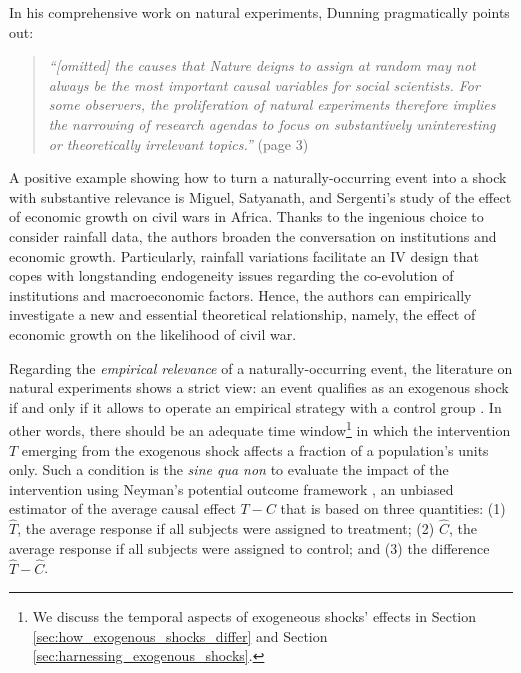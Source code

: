 \documentclass[11pt]{article}
\begin{document}
\begin{refsection}
In his comprehensive work on natural experiments, Dunning 
\autocite*{dunning_2012} pragmatically points out:

\begin{quote}
  \textit{
  ``[omitted] the causes that Nature deigns to assign at random may not always be
  the most important causal variables for social scientists. For some observers,
  the proliferation of natural experiments therefore implies the narrowing of
  research agendas to focus on substantively uninteresting or theoretically
  irrelevant topics.''
  }
  (page 3)
\end{quote}

A positive example showing how to turn a naturally-occurring event into a shock
with substantive relevance is Miguel, Satyanath, and Sergenti's
\autocite*{miguel_et_al_2004} study of the effect of economic growth on civil
wars in Africa. Thanks to the ingenious choice to consider rainfall data,
the authors broaden the conversation on institutions and economic growth.
Particularly, rainfall variations facilitate an IV design that copes with
longstanding endogeneity issues regarding the co-evolution of institutions and
macroeconomic factors. Hence, the authors can empirically investigate a new
and essential theoretical relationship, namely, the effect of economic growth on
the likelihood of civil war. 

Regarding the \textit{empirical relevance} of a naturally-occurring event, the
literature on natural experiments shows a strict view: an event qualifies as an
exogenous shock if and only if it allows to operate an empirical strategy with
a control group \autocite[][]{cook_et_al_2002}. In other words, there should be
an adequate time window\footnote{We discuss the temporal aspects of exogeneous
shocks' effects in Section \ref{sec:how_exogenous_shocks_differ} and Section
\ref{sec:harnessing_exogenous_shocks}.} in which the intervention $T$ emerging
from the exogenous shock affects a fraction of a population's units only.  Such a
condition is the \textit{sine qua non} to evaluate the impact of the intervention
using Neyman's potential outcome framework \autocite*{neyman_et_al_1923}, an
unbiased estimator of the average causal effect $T - C$ that is based on three
quantities: (1) $\widehat{T}$, the average response if all subjects were assigned
to treatment; (2) $\widehat{C}$, the average response if all subjects were assigned
to control; and (3) the difference $\hat{T} - \widehat{C}$.


\end{refsection}
\end{document}
